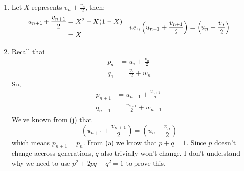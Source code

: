 \begin{homeworkProblem}[18]
\begin{enumerate}
\item Let $X$ represents $u_n + \frac{v_n}{2}$, then:\[
\begin{aligned}
    u_{n+1} + \frac{v_{n+1}}{2}
    &= X^2 + X(1 - X)\\
    &= X
\end{aligned}\\
\quad i.e.,
\left(u_{n+1} + \frac{v_{n+1}}{2}\right) =
\left(u_n + \frac{v_n}{2}\right)
\]

\item Recall that \[
    \begin{aligned}
        p_n &= u_n + \frac{v_n}{2}\\
        q_n &= \frac{v_n}{2} + w_n
    \end{aligned}
\]
So, \[
    \begin{aligned}
        p_{n+1} &= u_{n+1} + \frac{v_{n+1}}{2}\\
        q_{n+1} &= \frac{v_{n+1}}{2} + w_{n+1}
    \end{aligned}
\]
We've known from (j) that \[
    \left(u_{n+1} + \frac{v_{n+1}}{2}\right) = \left(u_n + \frac{v_n}{2}\right)
\]
which means $p_{n+1} = p_n$.
From (a) we know that $p + q = 1$. Since $p$ doesn't change accross generations,
$q$ also trivially won't change. 
I don't understand why we need to use $p^2 + 2pq + q^2 = 1$ to prove this.
\end{enumerate}
\end{homeworkProblem}